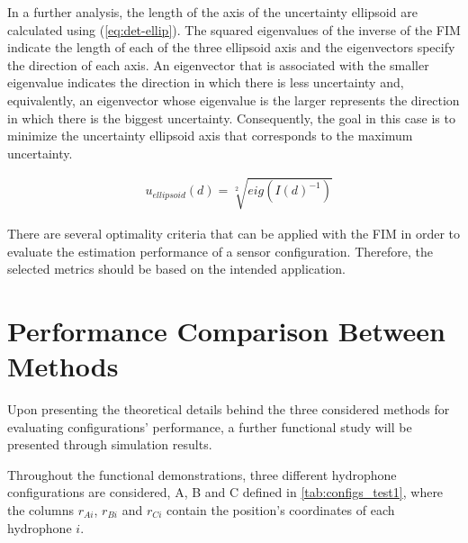 In a further analysis, the length of the axis of the uncertainty ellipsoid are calculated using (\ref{eq:det-ellip}). The squared eigenvalues of the inverse of the FIM indicate the length of each of the three ellipsoid axis and the eigenvectors specify the direction of each axis. An eigenvector that is associated with the smaller eigenvalue indicates the direction in which there is less uncertainty and, equivalently, an eigenvector whose eigenvalue is the larger represents the direction in which there is the biggest uncertainty. Consequently, the goal in this case is to minimize the uncertainty ellipsoid axis that corresponds to the maximum uncertainty.

\begin{eqnarray}
	& u_{ellipsoid}(d) = \sqrt[2]{eig(I(d)^{-1})}
	\label{eq:det-ellip}
\end{eqnarray}

There are several optimality criteria that can be applied with the FIM in order to evaluate the estimation performance of a sensor configuration. Therefore, the selected metrics should be based on the intended application.

\section{Performance Comparison Between Methods} \label{subsec:perform-compar-meth}

Upon presenting the theoretical details behind the three considered methods for evaluating configurations' performance, a further functional study will be presented through simulation results. 

Throughout the functional demonstrations, three different hydrophone configurations are considered, A, B and C defined in \ref{tab:configs_test1}, where the columns $r_{Ai}$, $r_{Bi}$ and $r_{Ci}$ contain the position's coordinates of each hydrophone $i$.

